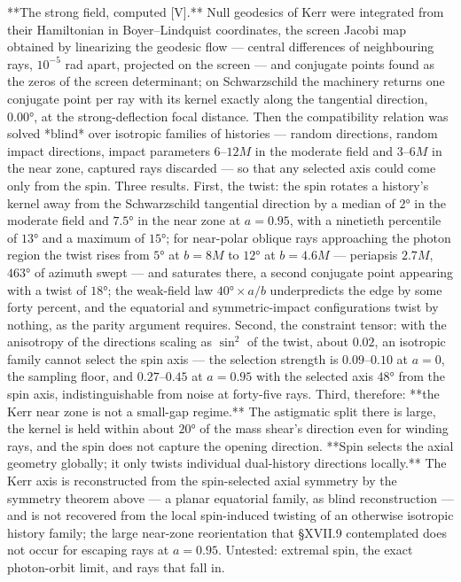 **The strong field, computed [V].** Null geodesics of Kerr were integrated from their Hamiltonian in Boyer–Lindquist coordinates, the screen Jacobi map obtained by linearizing the geodesic flow — central differences of neighbouring rays, $10^{-5}$ rad apart, projected on the screen — and conjugate points found as the zeros of the screen determinant; on Schwarzschild the machinery returns one conjugate point per ray with its kernel exactly along the tangential direction, $0.00°$, at the strong-deflection focal distance. Then the compatibility relation was solved *blind* over isotropic families of histories — random directions, random impact directions, impact parameters $6$–$12M$ in the moderate field and $3$–$6M$ in the near zone, captured rays discarded — so that any selected axis could come only from the spin. Three results. First, the twist: the spin rotates a history's kernel away from the Schwarzschild tangential direction by a median of $2°$ in the moderate field and $7.5°$ in the near zone at $a = 0.95$, with a ninetieth percentile of $13°$ and a maximum of $15°$; for near-polar oblique rays approaching the photon region the twist rises from $5°$ at $b = 8M$ to $12°$ at $b = 4.6M$ — periapsis $2.7M$, $463°$ of azimuth swept — and saturates there, a second conjugate point appearing with a twist of $18°$; the weak-field law $40°\times a/b$ underpredicts the edge by some forty percent, and the equatorial and symmetric-impact configurations twist by nothing, as the parity argument requires. Second, the constraint tensor: with the anisotropy of the directions scaling as $\sin^2$ of the twist, about $0.02$, an isotropic family cannot select the spin axis — the selection strength is $0.09$–$0.10$ at $a = 0$, the sampling floor, and $0.27$–$0.45$ at $a = 0.95$ with the selected axis $48°$ from the spin axis, indistinguishable from noise at forty-five rays. Third, therefore: **the Kerr near zone is not a small-gap regime.** The astigmatic split there is large, the kernel is held within about $20°$ of the mass shear's direction even for winding rays, and the spin does not capture the opening direction. **Spin selects the axial geometry globally; it only twists individual dual-history directions locally.** The Kerr axis is reconstructed from the spin-selected axial symmetry by the symmetry theorem above — a planar equatorial family, as blind reconstruction — and is not recovered from the local spin-induced twisting of an otherwise isotropic history family; the large near-zone reorientation that §XVII.9 contemplated does not occur for escaping rays at $a = 0.95$. Untested: extremal spin, the exact photon-orbit limit, and rays that fall in.

